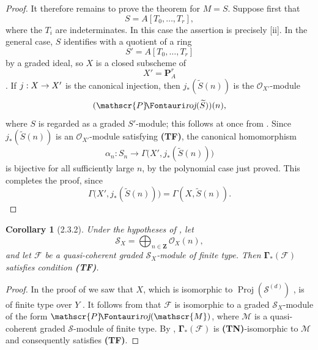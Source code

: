 \documentclass[oneside]{amsart}
\theoremstyle{ega-env-style}
\theoremstyle{ega-thm-env-style}
\newtheorem*{corollary}{Corollary}
\theoremstyle{ega-defn-env-style}
\def\mathcal{\mathscr}
\def\sh{\mathcal}                   %
\def\bb{\mathbf}                    %
\def\bbGamma{\boldsymbol\Gamma}
\def\Proj{\operatorname{Proj}}
\renewcommand{\to}{\mathchoice{\longrightarrow}{\rightarrow}{\rightarrow}{\rightarrow}}
\def\shProj{\sh{P}\textup{\kern-2.2pt{\Fontauri\slshape roj}}} %
\let\EGAOriginalLabel\label
\renewcommand{\label}[1]{\phantomsection\EGAOriginalLabel{#1}}
\begin{document}
\begin{proof}
It therefore remains to prove the theorem for $M=S$.
Suppose first that
\[
  S=A[T_0,\ldots,T_r],
\]
where the $T_i$ are indeterminates.
In this case the assertion is precisely [ii].
In the general case, $S$ identifies with a quotient of a ring
\[
  S'=A[T_0,\ldots,T_r]
\]
by a graded ideal, so $X$ is a closed subscheme of
\[
  X'=\bb{P}_A^r
\]
.
If $j:X\to X'$ is the canonical injection, then $j_*(\widetilde{S}(n))$ is the $\sh{O}_{X'}$-module
\[
  (\shProj(\widetilde{S}))(n),
\]
where $S$ is regarded as a graded $S'$-module; this follows at once from .
Since $j_*(\widetilde{S}(n))$ is an $\sh{O}_{X'}$-module satisfying \textbf{(TF)}, the canonical homomorphism
\[
  \alpha_n:S_n\longrightarrow
  \Gamma\bigl(X',j_*(\widetilde{S}(n))\bigr)
\]
is bijective for all sufficiently large $n$, by the polynomial case just proved.
This completes the proof, since
\[
  \Gamma\bigl(X',j_*(\widetilde{S}(n))\bigr)
  =\Gamma(X,\widetilde{S}(n)).
\]
\end{proof}

\begin{corollary}[2.3.2]
\label{III.2.3.2}
Under the hypotheses of , let
\[
  \sh{S}_X=\bigoplus_{n\in\bb{Z}}\sh{O}_X(n),
\]
and let $\sh{F}$ be a quasi-coherent graded $\sh{S}_X$-module of finite type.
Then $\bbGamma_*(\sh{F})$ satisfies condition \textbf{(TF)}.
\end{corollary}

\begin{proof}
In the proof of  we saw that $X$, which is isomorphic to $\Proj(\sh{S}^{(d)})$ , is of finite type over $Y$ .
It follows from  that $\sh{F}$ is isomorphic to a graded $\sh{S}_X$-module of the form $\shProj(\sh{M})$, where $\sh{M}$ is a quasi-coherent graded $\sh{S}$-module of finite type.
By , $\bbGamma_*(\sh{F})$ is \textbf{(TN)}-isomorphic to $\sh{M}$ and consequently satisfies \textbf{(TF)}.
\end{proof}
\end{document}

